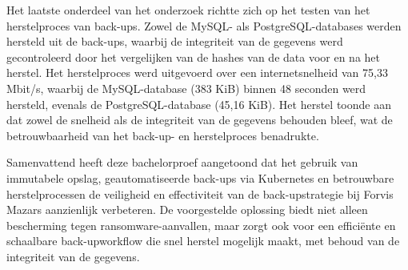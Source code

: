 Het laatste onderdeel van het onderzoek richtte zich op het testen van het herstelproces van back-ups. Zowel de MySQL- als PostgreSQL-databases werden hersteld uit de back-ups, waarbij de integriteit van de gegevens werd gecontroleerd door het vergelijken van de hashes van de data voor en na het herstel. Het herstelproces werd uitgevoerd over een internetsnelheid van 75,33 Mbit/s, waarbij de MySQL-database (383 KiB) binnen 48 seconden werd hersteld, evenals de PostgreSQL-database (45,16 KiB). Het herstel toonde aan dat zowel de snelheid als de integriteit van de gegevens behouden bleef, wat de betrouwbaarheid van het back-up- en herstelproces benadrukte.

Samenvattend heeft deze bachelorproef aangetoond dat het gebruik van immutabele opslag, geautomatiseerde back-ups via Kubernetes en betrouwbare herstelprocessen de veiligheid en effectiviteit van de back-upstrategie bij Forvis Mazars aanzienlijk verbeteren. De voorgestelde oplossing biedt niet alleen bescherming tegen ransomware-aanvallen, maar zorgt ook voor een efficiënte en schaalbare back-upworkflow die snel herstel mogelijk maakt, met behoud van de integriteit van de gegevens.

